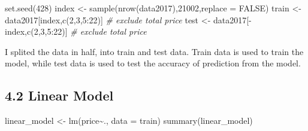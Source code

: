 \documentclass[
]{article}
\newenvironment{Shaded}{\begin{snugshade}}{\end{snugshade}}
\newcommand{\AttributeTok}[1]{\textcolor[rgb]{0.77,0.63,0.00}{#1}}
\newcommand{\CommentTok}[1]{\textcolor[rgb]{0.56,0.35,0.01}{\textit{#1}}}
\newcommand{\ConstantTok}[1]{\textcolor[rgb]{0.00,0.00,0.00}{#1}}
\newcommand{\DecValTok}[1]{\textcolor[rgb]{0.00,0.00,0.81}{#1}}
\newcommand{\FunctionTok}[1]{\textcolor[rgb]{0.00,0.00,0.00}{#1}}
\newcommand{\NormalTok}[1]{#1}
\newcommand{\OtherTok}[1]{\textcolor[rgb]{0.56,0.35,0.01}{#1}}
\newcommand{\SpecialCharTok}[1]{\textcolor[rgb]{0.00,0.00,0.00}{#1}}
\begin{document}
\begin{Shaded}
\begin{Highlighting}[]
\FunctionTok{set.seed}\NormalTok{(}\DecValTok{428}\NormalTok{)}
\NormalTok{index }\OtherTok{\textless{}{-}} \FunctionTok{sample}\NormalTok{(}\FunctionTok{nrow}\NormalTok{(data2017),}\DecValTok{21002}\NormalTok{,}\AttributeTok{replace =} \ConstantTok{FALSE}\NormalTok{)}
\NormalTok{train }\OtherTok{\textless{}{-}}\NormalTok{ data2017[index,}\FunctionTok{c}\NormalTok{(}\DecValTok{2}\NormalTok{,}\DecValTok{3}\NormalTok{,}\DecValTok{5}\SpecialCharTok{:}\DecValTok{22}\NormalTok{)] }\CommentTok{\# exclude total price }
\NormalTok{test }\OtherTok{\textless{}{-}}\NormalTok{ data2017[}\SpecialCharTok{{-}}\NormalTok{index,}\FunctionTok{c}\NormalTok{(}\DecValTok{2}\NormalTok{,}\DecValTok{3}\NormalTok{,}\DecValTok{5}\SpecialCharTok{:}\DecValTok{22}\NormalTok{)] }\CommentTok{\# exclude total price}
\end{Highlighting}
\end{Shaded}

I splited the data in half, into train and test data. Train data is used
to train the model, while test data is used to test the accuracy of
prediction from the model.

\hypertarget{linear-model}{%
\subsection{4.2 Linear Model}\label{linear-model}}

\begin{Shaded}
\begin{Highlighting}[]
\NormalTok{linear\_model }\OtherTok{\textless{}{-}} \FunctionTok{lm}\NormalTok{(price}\SpecialCharTok{\textasciitilde{}}\NormalTok{., }\AttributeTok{data =}\NormalTok{ train)}
\FunctionTok{summary}\NormalTok{(linear\_model)}
\end{Highlighting}
\end{Shaded}
\end{document}
